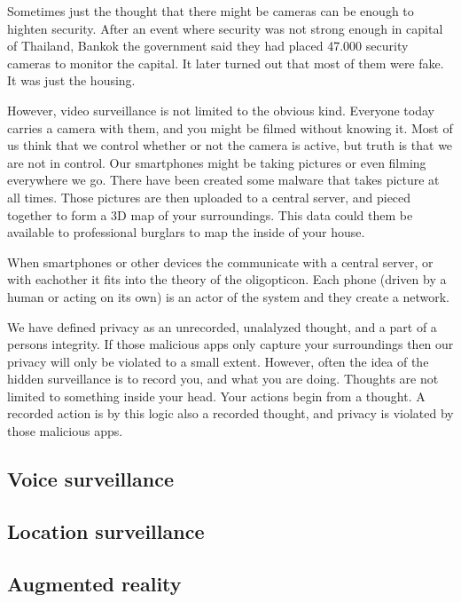 Sometimes just the thought that there might be cameras can be enough to highten security. After an event where security was not strong enough in capital of Thailand, Bankok the government said they had placed 47.000 security cameras to monitor the capital. It later turned out that most of them were fake. It was just the housing.\cite{website:bangkok-security}

However, video surveillance is not limited to the obvious kind. Everyone today carries a camera with them, and you might be filmed without knowing it. Most of us think that we control whether or not the camera is active, but truth is that we are not in control. Our smartphones might be taking pictures or even filming everywhere we go. There have been created some malware that takes picture at all times. Those pictures are then uploaded to a central server, and pieced together to form a 3D map of your surroundings. This data could them be available to professional burglars to map the inside of your house.\cite{website:pladeraider}

When smartphones or other devices the communicate with a central server, or with eachother it fits into the theory of the oligopticon. Each phone (driven by a human or acting on its own) is an actor of the system and they create a network.

We have defined privacy as an unrecorded, unalalyzed thought, and a part of a persons integrity. If those malicious apps only capture your surroundings then our privacy will only be violated to a small extent. However, often the idea of the hidden surveillance is to record you, and what you are doing. Thoughts are not limited to something inside your head. Your actions begin from a thought. A recorded action is by this logic also a recorded thought, and privacy is violated by those malicious apps.

\subsection{Voice surveillance}

\subsection{Location surveillance}

\subsection{Augmented reality}
